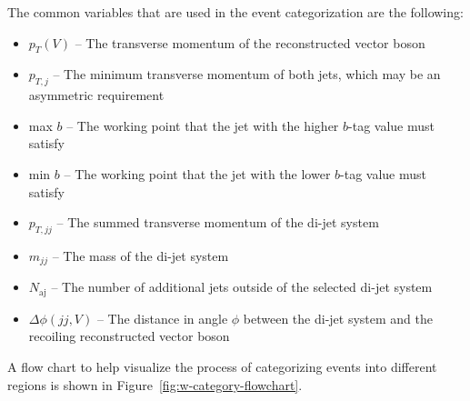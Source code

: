 %
The common variables that are used in the event categorization are the following:
\begin{itemize}
\item $p_T(V)$ -- The transverse momentum of the reconstructed vector boson
\item $p_{T,j}$ -- The minimum transverse momentum of both jets,
  which may be an asymmetric requirement
\item max $b$ -- The working point that the jet with the higher $b$-tag value must satisfy
\item min $b$ -- The working point that the jet with the lower $b$-tag value must satisfy
\item $p_{T,jj}$ -- The summed transverse momentum of the di-jet system
\item $m_{jj}$ -- The mass of the di-jet system
\item $N_\textrm{aj}$ -- The number of additional jets outside of the selected di-jet system
\item $\Delta\phi(jj, V)$ -- The distance in angle $\phi$ between the di-jet system
  and the recoiling reconstructed vector boson
\end{itemize}
A flow chart to help visualize the process of categorizing events into different regions is shown
in Figure~\ref{fig:w-category-flowchart}.
%
